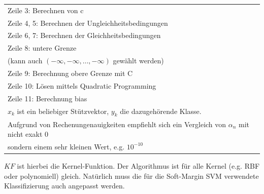 \documentclass[a4paper,11pt,twoside]{scrreprt}
\begin{document}
\begin{table}[H]
\begin{tabular}{|l|}
    Zeile 3: Berechnen von c \\
    Zeile 4, 5: Berechnen der Ungleichheitsbedingungen\\
    Zeile 6, 7: Berechnen der Gleichheitsbedingungen\\
    Zeile 8: untere Grenze \\
    (kann auch $\left( -\infty, -\infty, \ldots, -\infty \right)$ gewählt werden) \\
    Zeile 9: Berechnung obere Grenze mit C \\
    Zeile 10: Lösen mittels Quadratic Programming \\
    Zeile 11: Berechnung bias \\
    $x_{k}$ ist ein beliebiger Stützvektor, $y_{k}$ die dazugehörende Klasse. \\
    Aufgrund von Rechenungenauigkeiten empfiehlt sich ein Vergleich von $\alpha_{n}$ mit nicht exakt $0$ \\
    sondern einem sehr kleinen Wert, e.g. $10^{-10}$ \\
    \hline
\end{tabular}
\end{table}
$KF$ ist hierbei die Kernel-Funktion.
Der Algorithmus ist für alle Kernel (e.g. RBF oder polynomiell) gleich.
Natürlich muss die für die Soft-Margin SVM verwendete Klassifizierung auch angepasst werden.
\end{document}
